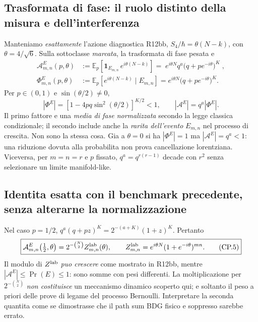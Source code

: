 \documentclass[11pt,a4paper]{article}
\begin{document}
\subsection*{Trasformata di fase: il ruolo distinto della misura e dell'interferenza}
Manteniamo \emph{esattamente} l'azione diagnostica R12bb, $S_4/\hbar=\theta(N-k)$, con $\theta=4/\sqrt6$. Sulla sottoclasse \emph{marcata}, la trasformata di fase pesata e
\begin{align}
 \mathcal A^E_{m,n}(p,\theta)
 &:=\mathbb E_p\!\left[\mathbf1_{E_{m,n}}\,e^{i\theta(N-k)}\right]
 =\boxed{\;e^{i\theta N}q^a\bigl(q+p e^{-i\theta}\bigr)^K\;}\tag{CP.3a},\\
 \Phi^E_{m,n}(p,\theta)
 &:=\mathbb E_p\!\left[e^{i\theta(N-k)}\mid E_{m,n}\right]
 =e^{i\theta N}\bigl(q+p e^{-i\theta}\bigr)^K .\tag{CP.3b}
\end{align}
Per $p\in(0,1)$ e $\sin(\theta/2)\ne0$,
\begin{equation}
 \boxed{|\Phi^E|=\left[1-4pq\sin^2(\theta/2)\right]^{K/2}<1,\qquad
 |\mathcal A^E|=q^a|\Phi^E|.\tag{CP.4}}
 \label{eq:r12bbcp-twofactors}
\end{equation}
Il primo fattore e una \emph{media di fase normalizzata} secondo la legge classica condizionale; il secondo include anche la \emph{rarita dell'evento} $E_{m,n}$ nel processo di crescita. Non sono la stessa cosa. Gia a $\theta=0$ si ha $|\Phi^E|=1$ ma $|\mathcal A^E|=q^a<1$: una riduzione dovuta alla probabilita non prova cancellazione lorentziana. Viceversa, per $m=n=r$ e $p$ fissato, $q^a=q^{r(r-1)}$ decade con $r^2$ senza selezionare un limite manifold-like.

\subsection*{Identita esatta con il benchmark precedente, senza alterarne la normalizzazione}
Nel caso $p=1/2$, $q^a(q+p z)^K=2^{-(a+K)}(1+z)^K$. Pertanto
\begin{equation}
 \boxed{\mathcal A^E_{m,n}\!\left(\tfrac12,\theta\right)
 =2^{-\binom N2}Z^{\rm lab}_{m,n}(\theta),\qquad
 Z^{\rm lab}_{m,n}=e^{i\theta N}(1+e^{-i\theta})^{mn}.\tag{CP.5}}
 \label{eq:r12bbcp-half}
\end{equation}
Il modulo di $Z^{\rm lab}$ \emph{puo crescere} come mostrato in R12bb, mentre $|\mathcal A^E|\le \Pr(E)\le1$: sono somme con pesi differenti. La moltiplicazione per $2^{-\binom N2}$ \emph{non costituisce} un meccanismo dinamico scoperto qui; e soltanto il peso a priori delle prove di legame del processo Bernoulli. Interpretare la seconda quantita come se dimostrasse che il path sum BDG fisico e soppresso sarebbe errato.
\end{document}
